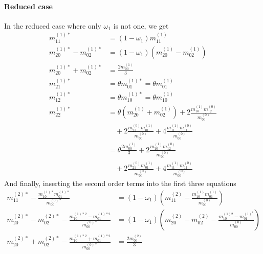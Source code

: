 \paragraph{Reduced case}
\label{par:Reduced case}
In the reduced case where only $\omega_1$ is not one, we get
\begin{equation}
  \begin{aligned}
    m_{11}^{(1)*} & = (1-\omega_1) m_{11}^{(1)} \\
    m_{20}^{(1)*} - m_{02}^{(1)*}
      & = (1-\omega_1) (m_{20}^{(1)} - m_{02}^{(1)}) \\
    m_{20}^{(1)*} + m_{02}^{(1)*}
      & =  \frac{2 m_{00}^{(1)}}{3} \\
    m_{21}^{(1)*} & = \theta m_{01}^{(1)*} = \theta m_{01}^{(1)} \\
    m_{12}^{(1)*} & = \theta m_{10}^{(1)*} = \theta m_{10}^{(1)} \\
    m_{22}^{(1)*} & =  \theta (m_{20}^{(1)} + m_{02}^{(1)})
      + 2\frac{ m_{10}^{(1)} m_{12}^{(0)} }{m_{00}^{(0)}}
      \\&\quad
      + 2\frac{ m_{21}^{(0)} m_{01}^{(1)} }{m_{00}^{(0)}}
      + 4\frac{ m_{11}^{(1)} m_{11}^{(0)} }{m_{00}^{(0)}}
      \\&= \theta \frac{2 m_{00}^{(1)}}{3} + 2\frac{ m_{10}^{(1)} m_{12}^{(0)} }{m_{00}^{(0)}}
      \\&\quad
      + 2\frac{ m_{21}^{(0)} m_{01}^{(1)} }{m_{00}^{(0)}}
      + 4\frac{ m_{11}^{(1)} m_{11}^{(0)} }{m_{00}^{(0)}}
  \end{aligned}
\end{equation}
And finally, inserting the second order terms into the first three equations
\begin{equation}
  \begin{aligned}
    m_{11}^{(2)*} - \frac{ m_{10}^{(1)*}m_{01}^{(1)*}}{m_{00}^{(0)*}} & = (1-\omega_1)\left(m_{11}^{(2)} - \frac{ m_{10}^{(1)}m_{01}^{(1)}}{m_{00}^{(0)}}\right) \\
    m_{20}^{(2)*}-m_{02}^{(2)*} - \frac{ m_{10}^{(1)*2} - m_{01}^{(1)*2}}{m_{00}^{(0)*}} & = (1-\omega_1) \left(m_{20}^{(2)}-m_{02}^{(2)} - \frac{ m_{10}^{(1)2} - m_{01}^{{(1)}^2}}{m_{00}^{(0)}}\right) \\
    m_{20}^{(2)*}+m_{02}^{(2)*} - \frac{ m_{10}^{(1)*2} + m_{01}^{(1)*2}}{m_{00}^{(0)*}} & = \frac{2 m_{00}^{(2)}}{3}
  \end{aligned}
\end{equation}


